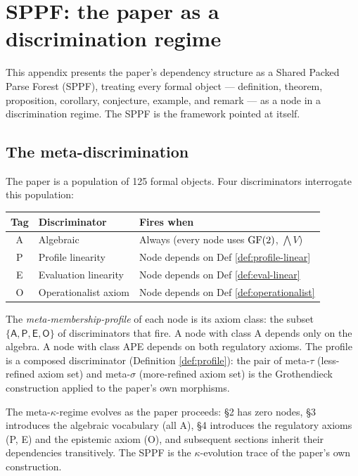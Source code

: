 \section{SPPF: the paper as a discrimination regime}
\label{app:sppf}

This appendix presents the paper's dependency structure as
a Shared Packed Parse Forest (SPPF), treating every formal
object --- definition, theorem, proposition, corollary,
conjecture, example, and remark --- as a node in a
discrimination regime. The SPPF is the framework pointed
at itself.

\subsection{The meta-discrimination}

The paper is a population of 125 formal objects. Four
discriminators interrogate this population:

\begin{center}
\small
\begin{tabular}{c|l|l}
\textbf{Tag} & \textbf{Discriminator} & \textbf{Fires when} \\
\hline
\textsf{A} & Algebraic & Always (every node uses
  $\operatorname{GF}(2)$, $\bigwedge V$) \\
\textsf{P} & Profile linearity &
  Node depends on Def \ref{def:profile-linear} \\
\textsf{E} & Evaluation linearity &
  Node depends on Def \ref{def:eval-linear} \\
\textsf{O} & Operationalist axiom &
  Node depends on Def \ref{def:operationalist}
\end{tabular}
\end{center}

The \emph{meta-membership-profile} of each node is its
axiom class: the subset $\{\textsf{A}, \textsf{P},
\textsf{E}, \textsf{O}\}$ of discriminators that fire.
A node with class \textsf{A} depends only on the algebra.
A node with class \textsf{APE} depends on both regulatory
axioms. The profile is a composed discriminator
(Definition \ref{def:profile}): the pair of meta-$\tau$
(less-refined axiom set) and meta-$\sigma$ (more-refined
axiom set) is the Grothendieck construction applied to
the paper's own morphisms.

The meta-$\kappa$-regime evolves as the paper proceeds:
\S2 has zero nodes, \S3 introduces the algebraic
vocabulary (all \textsf{A}), \S4 introduces the
regulatory axioms (\textsf{P}, \textsf{E}) and the
epistemic axiom (\textsf{O}), and subsequent sections
inherit their dependencies transitively. The SPPF is the
$\kappa$-evolution trace of the paper's own construction.

